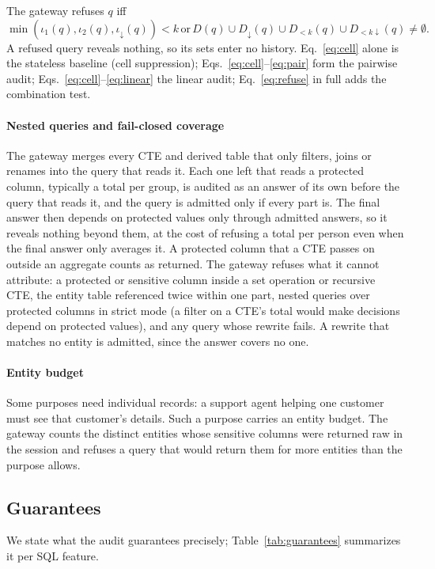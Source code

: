 \documentclass[sigconf,nonacm]{acmart}
\begin{document}
The gateway refuses $q$ iff
\begin{equation}\label{eq:refuse}
\min(\iota_1(q),\iota_2(q),\iota_{\downarrow}(q))<k\,\text{or}\,D(q)\cup D_{\downarrow}(q)\cup D_{<k}(q)\cup D_{<k\downarrow}(q)\ne\emptyset .
\end{equation}
A refused query reveals nothing, so its sets enter no history. Eq.~\ref{eq:cell} alone is the stateless baseline (cell suppression); Eqs.~\ref{eq:cell}--\ref{eq:pair} form the pairwise audit; Eqs.~\ref{eq:cell}--\ref{eq:linear} the linear audit; Eq.~\ref{eq:refuse} in full adds the combination test.

\paragraph{Nested queries and fail-closed coverage} The gateway merges every CTE and derived table that only filters, joins or renames into the query that reads it. Each one left that reads a protected column, typically a total per group, is audited as an answer of its own before the query that reads it, and the query is admitted only if every part is. The final answer then depends on protected values only through admitted answers, so it reveals nothing beyond them, at the cost of refusing a total per person even when the final answer only averages it. A protected column that a CTE passes on outside an aggregate counts as returned. The gateway refuses what it cannot attribute: a protected or sensitive column inside a set operation or recursive CTE, the entity table referenced twice within one part, nested queries over protected columns in strict mode (a filter on a CTE's total would make decisions depend on protected values), and any query whose rewrite fails. A rewrite that matches no entity is admitted, since the answer covers no one.

\paragraph{Entity budget} Some purposes need individual records: a support agent helping one customer must see that customer's details. Such a purpose carries an entity budget. The gateway counts the distinct entities whose sensitive columns were returned raw in the session and refuses a query that would return them for more entities than the purpose allows.

\subsection{Guarantees}\label{sec:guarantees}
We state what the audit guarantees precisely; Table~\ref{tab:guarantees} summarizes it per SQL feature.
\end{document}
